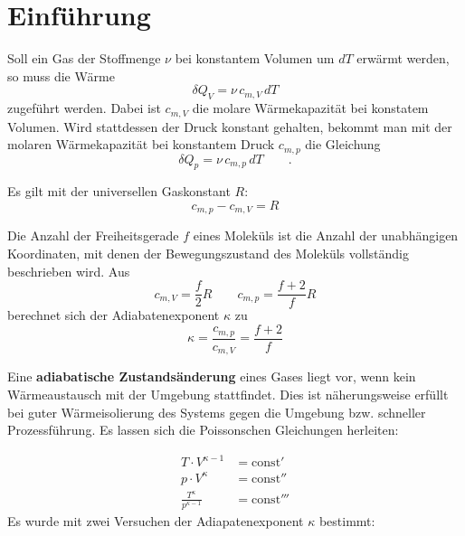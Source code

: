 \section{Einführung}
Soll ein Gas der Stoffmenge $\nu$ bei konstantem Volumen um $dT$ erwärmt werden, so muss die Wärme 
\begin{equation}
	\delta Q_V=\nu\, c_{m,V}\, dT
\label{eq:cv}
\end{equation}
zugeführt werden. Dabei ist $c_{m,V}$ die molare Wärmekapazität bei konstatem Volumen.
Wird stattdessen der Druck konstant gehalten, bekommt man mit der molaren Wärmekapazität bei konstantem Druck $c_{m,p}$ die Gleichung
\begin{equation}
	\delta Q_p=\nu\, c_{m,p}\, dT\qquad .
\label{eq:cp}
\end{equation}

Es gilt mit der universellen Gaskonstant $R$:
\begin{equation}
	c_{m,p} - c_{m,V}=R
\label{eq:cvminuscp}
\end{equation}

Die Anzahl der Freiheitsgerade $f$ eines Moleküls ist die Anzahl der unabhängigen Koordinaten, mit denen der Bewegungszustand des Moleküls vollständig beschrieben wird. Aus 
\begin{equation}
	c_{m,V}=\frac{f}{2}R\qquad c_{m,p}=\frac{f+2}{f}R
\label{eq:freiheit}
\end{equation}
berechnet sich der Adiabatenexponent $\kappa$ zu 
\begin{equation}
	\kappa=\frac{c_{m,p}}{c_{m,V}}=\frac{f+2}{f}
\label{eq:kappa}
\end{equation}

Eine \textbf{adiabatische Zustandsänderung} eines Gases liegt vor, wenn kein Wärmeaustausch mit der Umgebung stattfindet. Dies ist näherungsweise erfüllt bei guter Wärmeisolierung des Systems gegen die Umgebung bzw. schneller Prozessführung. Es lassen sich die Poissonschen Gleichungen herleiten:

\begin{align}
	T\cdot V^{\kappa-1}&=\text{const}' \\
	p\cdot V^{\kappa}&=\text{const}'' \\
	\frac{T^{\kappa}}{p^{\kappa-1}}&=\text{const}'''
\label{eq:poisson}
\end{align}
Es wurde mit zwei Versuchen der Adiapatenexponent $\kappa$ bestimmt:
